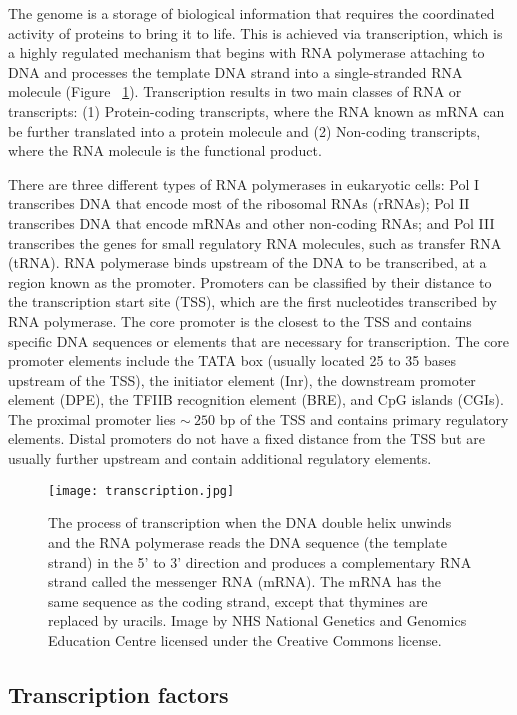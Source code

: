 The genome is a storage of biological information that requires the coordinated activity of proteins to bring it to life. This is achieved via transcription, which is a highly regulated mechanism that begins with RNA polymerase attaching to DNA and processes the template DNA strand into a single-stranded RNA molecule (Figure ~\ref{fig:transcription}). Transcription results in two main classes of RNA or transcripts: (1) Protein-coding transcripts, where the RNA known as mRNA can be further translated into a protein molecule and (2) Non-coding transcripts, where the RNA molecule is the functional product.

There are three different types of RNA polymerases in eukaryotic cells: Pol I transcribes DNA that encode most of the ribosomal RNAs (rRNAs); Pol II transcribes DNA that encode mRNAs and other non-coding RNAs; and Pol III transcribes the genes for small regulatory RNA molecules, such as transfer RNA (tRNA). RNA polymerase binds upstream of the DNA to be transcribed, at a region known as the promoter. Promoters can be classified by their distance to the transcription start site (TSS), which are the first nucleotides transcribed by RNA polymerase. The core promoter is the closest to the TSS and contains specific DNA sequences or elements that are necessary for transcription. The core promoter elements include the TATA box (usually located 25 to 35 bases upstream of the TSS), the initiator element (Inr), the downstream promoter element (DPE), the TFIIB recognition element (BRE), and CpG islands (CGIs). The proximal promoter lies $\sim~250$ bp of the TSS and contains primary regulatory elements. Distal promoters do not have a fixed distance from the TSS but are usually further upstream and contain additional regulatory elements.

\begin{figure}[!ht]
   \centering
   \texttt{[image: transcription.jpg]}
   \caption[DNA transcription]{The process of transcription when the DNA double helix unwinds and the RNA polymerase reads the DNA sequence (the template strand) in the 5' to 3' direction and produces a complementary RNA strand called the messenger RNA (mRNA). The mRNA has the same sequence as the coding strand, except that thymines are replaced by uracils. Image by NHS National Genetics and Genomics Education Centre licensed under the Creative Commons license.}
   \label{fig:transcription}
\end{figure}

\subsection{Transcription factors}

